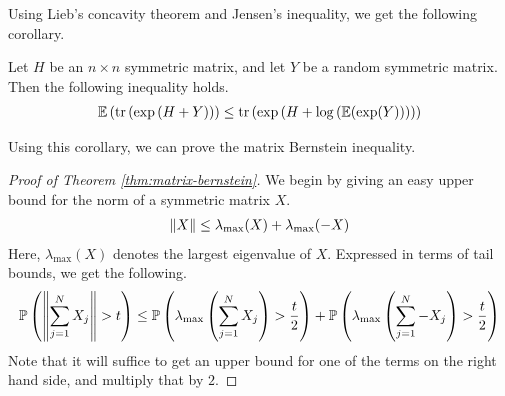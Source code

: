 \documentclass[11pt]{article}
\begin{document}
Using Lieb's concavity theorem and Jensen's inequality, we get the following corollary.
\begin{corollary}
  \label{cor:lieb}
  Let $H$ be an $n \times n$ symmetric matrix, and let $Y$ be a random symmetric matrix.
  Then the following inequality holds.
  \begin{align}
    \label{eq:2}
    \mathbb{E} \left( \mathrm{tr} \left( \exp\left( H + Y \right) \right) \right)
    \leq \mathrm{tr}\left( \exp\left( H + \log\left( \mathbb{E}(\exp(Y)) \right) \right) \right)
  \end{align}
\end{corollary}
Using this corollary, we can prove the matrix Bernstein inequality.

\begin{proof}[Proof of Theorem \ref{thm:matrix-bernstein}]
  We begin by giving an easy upper bound for the norm of a symmetric matrix $X$.
  \begin{align*}
    \left\lVert X\right\rVert \leq \lambda_{\mathrm{max}}(X) + \lambda_{\mathrm{max}}(-X)
  \end{align*}
  Here, $\lambda_{\mathrm{max}}(X)$ denotes the largest eigenvalue of $X$.
  Expressed in terms of tail bounds, we get the following.
  \begin{align*}
    \mathbb{P}\left( \left\lVert\sum_{j=1}^N X_j\right\rVert > t \right)
    \leq \mathbb{P}\left( \lambda_{\mathrm{max}} \left( \sum_{j=1}^N X_j \right) > \frac{t}{2} \right)
    + \mathbb{P}\left( \lambda_{\mathrm{max}} \left( \sum_{j=1}^N -X_j \right) > \frac{t}{2} \right)
  \end{align*}
  Note that it will suffice to get an upper bound for one of the terms on the right hand side, and multiply that by $2$.


\end{proof}
\end{document}
